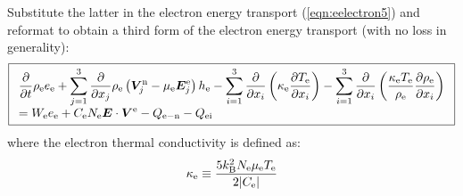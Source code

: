 \documentclass{warpdoc}
\newcommand\frameeqn[1]{\fbox{$\displaystyle #1$}}
\newcommand{\mfd}{\displaystyle}
\renewcommand{\vec}[1]{\bm{#1}}
\begin{document}
% 
Substitute the latter in the electron energy transport (\ref{eqn:eelectron5}) and reformat to obtain a third form of the electron energy transport (with no loss in generality):
%
\begin{equation}
\frameeqn{
\begin{array}{l}\mfd
 \frac{\partial }{\partial t}\rho_{\rm e} e_{\rm e} 
+ \sum_{j=1}^3  \frac{\partial }{\partial x_j} \rho_{\rm e} \left(\vec{V}^{\rm n}_j - \mu_{\rm e} \vec{E}^{\rm e}_j\right) h_{\rm e} 
-\sum_{i=1}^{3}\frac{\partial }{\partial x_i}\left(\kappa_{\rm e}\frac{\partial T_{\rm e}}{\partial x_i}\right)
-\sum_{i=1}^{3}\frac{\partial }{\partial x_i}\left(\frac{\kappa_{\rm e} T_{\rm e}}{\rho_{\rm e} } \frac{\partial \rho_{\rm e}}{\partial x_i}\right)\\ \mfd
= 
 W_{\rm e} e_{\rm e}
+   C_{\rm e} N_{\rm e} \vec{E} \cdot \vec{V}^{\rm e}  
- Q_{\rm e-n}
- Q_{\rm ei}
\end{array}
}
\label{eqn:eenergy}
\end{equation}
%  
where the electron thermal conductivity is defined as:
%
\begin{equation}
\kappa_{\rm e} \equiv \frac{5 k_{\rm B}^2 N_{\rm e} \mu_{\rm e} T_{\rm e}}{2 |C_{\rm e}|} 
\end{equation}
%
\end{document}
